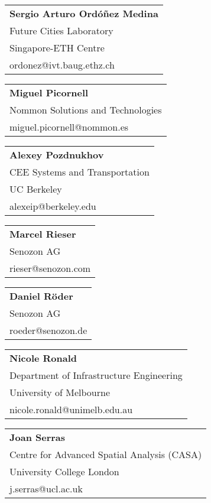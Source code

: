\begin{tabular}[width=0.48\textwidth]{l}
\textbf{Sergio Arturo Ordóñez Medina} \\
Future Cities Laboratory \\
Singapore-ETH Centre\\
ordonez@ivt.baug.ethz.ch \\
\end{tabular}

\begin{tabular}[width=0.48\textwidth]{l}
\textbf{Miguel Picornell} \\
Nommon Solutions and Technologies \\
miguel.picornell@nommon.es \\
\end{tabular}

\begin{tabular}[width=0.48\textwidth]{l}
\textbf{Alexey Pozdnukhov} \\
CEE Systems and Transportation \\
UC Berkeley \\
alexeip@berkeley.edu \\
\end{tabular}

\begin{tabular}[width=0.48\textwidth]{l}
\textbf{Marcel Rieser} \\
Senozon AG \\
rieser@senozon.com \\
\end{tabular}

\begin{tabular}[width=0.48\textwidth]{l}
\textbf{Daniel Röder} \\
Senozon AG \\
roeder@senozon.de \\
\end{tabular}

\begin{tabular}[width=0.48\textwidth]{l}
\textbf{Nicole Ronald} \\
Department of Infrastructure Engineering \\
University of Melbourne \\
nicole.ronald@unimelb.edu.au \\
\end{tabular}

\begin{tabular}[width=0.48\textwidth]{l}
\textbf{Joan Serras} \\
Centre for Advanced Spatial Analysis (CASA) \\
University College London \\
j.serras@ucl.ac.uk \\
\end{tabular}

